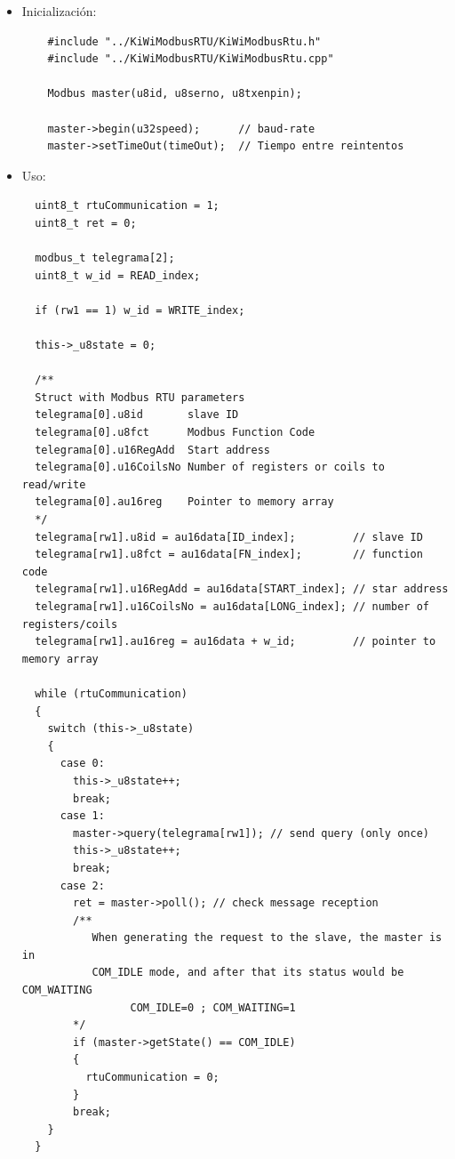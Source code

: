 \begin{itemize}
  \item Inicialización:
  
  \begin{lstlisting}
    #include "../KiWiModbusRTU/KiWiModbusRtu.h"
    #include "../KiWiModbusRTU/KiWiModbusRtu.cpp"
    
    Modbus master(u8id, u8serno, u8txenpin);
    
    master->begin(u32speed);      // baud-rate
    master->setTimeOut(timeOut);  // Tiempo entre reintentos
  \end{lstlisting}  

  \item Uso:
  
  \begin{lstlisting}
  uint8_t rtuCommunication = 1;
  uint8_t ret = 0;

  modbus_t telegrama[2];
  uint8_t w_id = READ_index;

  if (rw1 == 1) w_id = WRITE_index;

  this->_u8state = 0;

  /**
  Struct with Modbus RTU parameters
  telegrama[0].u8id       slave ID
  telegrama[0].u8fct      Modbus Function Code
  telegrama[0].u16RegAdd  Start address
  telegrama[0].u16CoilsNo Number of registers or coils to read/write
  telegrama[0].au16reg    Pointer to memory array
  */
  telegrama[rw1].u8id = au16data[ID_index];         // slave ID
  telegrama[rw1].u8fct = au16data[FN_index];        // function code
  telegrama[rw1].u16RegAdd = au16data[START_index]; // star address
  telegrama[rw1].u16CoilsNo = au16data[LONG_index]; // number of registers/coils
  telegrama[rw1].au16reg = au16data + w_id;         // pointer to memory array

  while (rtuCommunication)
  {
    switch (this->_u8state)
    {
      case 0:
        this->_u8state++;
        break;
      case 1:
        master->query(telegrama[rw1]); // send query (only once)
        this->_u8state++;
        break;
      case 2:
        ret = master->poll(); // check message reception
        /**
           When generating the request to the slave, the master is in
           COM_IDLE mode, and after that its status would be COM_WAITING
                 COM_IDLE=0 ; COM_WAITING=1
        */
        if (master->getState() == COM_IDLE)
        {
          rtuCommunication = 0;
        }
        break;
    }
  }
  \end{lstlisting} 
\end{itemize}

